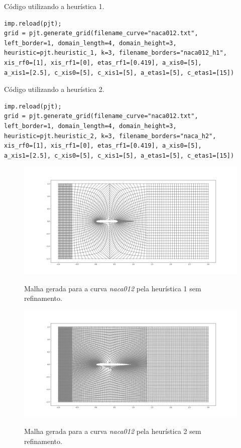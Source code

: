 \documentclass[a4paper]{article}
\begin{document}
Código utilizando a heurística 1.
\begin{verbatim}
imp.reload(pjt);  
grid = pjt.generate_grid(filename_curve="naca012.txt", 
left_border=1, domain_length=4, domain_height=3,
heuristic=pjt.heuristic_1, k=3, filename_borders="naca012_h1", 
xis_rf0=[1], xis_rf1=[0], etas_rf1=[0.419], a_xis0=[5], 
a_xis1=[2.5], c_xis0=[5], c_xis1=[5], a_etas1=[5], c_etas1=[15])
\end{verbatim}

Código utilizando a heurística 2.
\begin{verbatim}
imp.reload(pjt);  
grid = pjt.generate_grid(filename_curve="naca012.txt", 
left_border=1, domain_length=4, domain_height=3,
heuristic=pjt.heuristic_2, k=3, filename_borders="naca_h2", 
xis_rf0=[1], xis_rf1=[0], etas_rf1=[0.419], a_xis0=[5], 
a_xis1=[2.5], c_xis0=[5], c_xis1=[5], a_etas1=[5], c_etas1=[15])
\end{verbatim}


\begin{figure}[H]
	\centering
	\includegraphics[width=1.0\textwidth]{naca_h1.png}
	\label{fig:naca_h1} 
	\caption[caption]{Malha gerada para a curva \textit{naca012 } pela heurística 1 sem refinamento.}
\end{figure}

\begin{figure}[H]
	\centering
	\includegraphics[width=1.0\textwidth]{naca_h2.png}
	\label{fig:naca_h2} 
	\caption[caption]{Malha gerada para a curva \textit{naca012 } pela heurística 2 sem refinamento.}
\end{figure}
\end{document}
